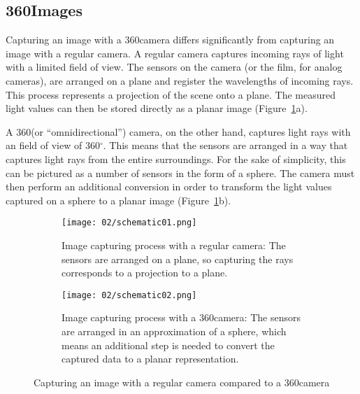 \subsection{360\degree Images}\label{subsec:fundamentals_360}
Capturing an image with a 360\degree camera differs significantly from capturing an image with a regular camera. A regular camera captures incoming rays of light with a limited field of view. The sensors on the camera (or the film, for analog cameras), are arranged on a plane and register the wavelengths of incoming rays. This process represents a projection of the scene onto a plane. The measured light values can then be stored directly as a planar image (Figure~\ref{fig:cameras}a).

A 360\degree (or ``omnidirectional'') camera, on the other hand, captures light rays with an field of view of 360$^{\circ}$. This means that the sensors are arranged in a way that captures light rays from the entire surroundings. For the sake of simplicity, this can be pictured as a number of sensors in the form of a sphere\footnotemark. The camera must then perform an additional conversion in order to transform the light values captured on a sphere to a planar image (Figure~\ref{fig:cameras}b).


\begin{figure}
\centering
    \begin{subfigure}[t]{0.9\textwidth}            
            \centering
            \texttt{[image: 02/schematic01.png]}
            \caption{Image capturing process with a regular camera: The sensors are arranged on a plane, so capturing the rays corresponds to a projection to a plane.}
    \end{subfigure}
    \begin{subfigure}[t]{0.9\textwidth}
            \centering
            \texttt{[image: 02/schematic02.png]}
            \caption{Image capturing process with a 360\degree camera: The sensors are arranged in an approximation of a sphere, which means an additional step is needed to convert the captured data to a planar representation.}
    \end{subfigure}
    \caption{Capturing an image with a regular camera compared to a 360\degree camera}\label{fig:cameras}
\end{figure}

